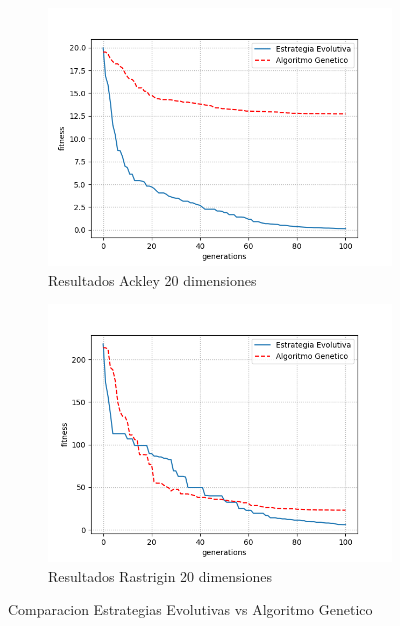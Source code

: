 \documentclass[twocolumn]{IEEEtran}
\begin{document}
\begin{figure}[htpb!]
    \centering
    \begin{subfigure}[htpb!]{1\linewidth}
        \includegraphics[width=\linewidth]{figures/ESvsGA_ackley.png}
        \caption{Resultados Ackley 20 dimensiones}
    \end{subfigure}
    \begin{subfigure}[htpb!]{1\linewidth}
        \includegraphics[width=\linewidth]{figures/ESvsGA_rastrigin.png}
        \caption{Resultados Rastrigin 20 dimensiones}
        \label{figure:esga_rastrigin}
    \end{subfigure}
    \caption{Comparacion Estrategias Evolutivas vs Algoritmo Genetico}
\end{figure}
\end{document}
